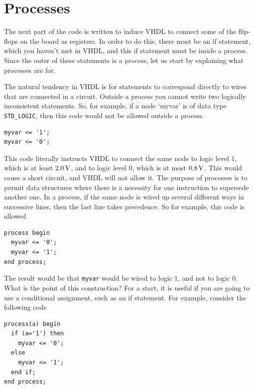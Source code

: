 \documentclass[../physical_computing.tex]{subfiles}
\begin{document}
\section{Processes}
\label{sec:processes}

The next part of the code is written to induce VHDL to connect some of the flip-flops on the board as registers. In order to do this, there must be an if statement, which you haven't met in VHDL, and this if statement must be inside a process. Since the outer of these statements is a process, let us start by explaining what processes are for.

The natural tendency in VHDL is for statements to correspond directly to wires that are connected in a circuit. Outside a process you cannot write two logically inconsistent statements. So, for example, if a node `myvar' is of data type \texttt{STD\_LOGIC}, then this code would not be allowed outside a process.

\begin{verbatim}
myvar <= '1';
myvar <= '0';
\end{verbatim}

This code literally instructs VHDL to connect the same node to logic level $1$, which is at least $\rm 2.0\,V$, and to logic level $0$, which is at most $\rm 0.8\,V$. This would cause a short circuit, and VHDL will not allow it. The purpose of processes is to permit data structures where there is a necessity for one instruction to supersede another one. In a process, if the same node is wired up several different ways in successive lines, then the last line takes precedence. So for example, this code is allowed

\begin{verbatim}
process begin
  myvar <= '0';
  myvar <= '1';
end process;
\end{verbatim}

The result would be that \texttt{myvar} would be wired to logic $1$, and not to logic $0$. What is the point of this construction? For a start, it is useful if you are going to use a conditional assignment, such as an if statement. For example, consider the following code

\begin{verbatim}
process(a) begin
  if (a='1') then
    myvar <= '0'; 
  else
    myvar <= '1';
  end if;
end process;
\end{verbatim}
\end{document}
